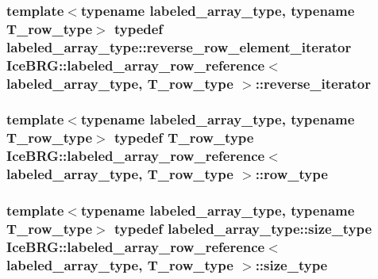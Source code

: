 \subsubsection[{reverse\+\_\+iterator}]{\setlength{\rightskip}{0pt plus 5cm}template$<$typename labeled\+\_\+array\+\_\+type, typename T\+\_\+row\+\_\+type$>$ typedef labeled\+\_\+array\+\_\+type\+::reverse\+\_\+row\+\_\+element\+\_\+iterator {\bf Ice\+B\+R\+G\+::labeled\+\_\+array\+\_\+row\+\_\+reference}$<$ labeled\+\_\+array\+\_\+type, T\+\_\+row\+\_\+type $>$\+::{\bf reverse\+\_\+iterator}}\label{classIceBRG_1_1labeled__array__row__reference_a69e88ba1f1071a47fa00e4ec45f8147d}
\hypertarget{classIceBRG_1_1labeled__array__row__reference_a5b537072b2f12f7a4ea9484e2e26986d}{}
\subsubsection[{row\+\_\+type}]{\setlength{\rightskip}{0pt plus 5cm}template$<$typename labeled\+\_\+array\+\_\+type, typename T\+\_\+row\+\_\+type$>$ typedef T\+\_\+row\+\_\+type {\bf Ice\+B\+R\+G\+::labeled\+\_\+array\+\_\+row\+\_\+reference}$<$ labeled\+\_\+array\+\_\+type, T\+\_\+row\+\_\+type $>$\+::{\bf row\+\_\+type}}\label{classIceBRG_1_1labeled__array__row__reference_a5b537072b2f12f7a4ea9484e2e26986d}
\hypertarget{classIceBRG_1_1labeled__array__row__reference_a80c5d11ebfa639fa27894ce288633df0}{}
\subsubsection[{size\+\_\+type}]{\setlength{\rightskip}{0pt plus 5cm}template$<$typename labeled\+\_\+array\+\_\+type, typename T\+\_\+row\+\_\+type$>$ typedef labeled\+\_\+array\+\_\+type\+::size\+\_\+type {\bf Ice\+B\+R\+G\+::labeled\+\_\+array\+\_\+row\+\_\+reference}$<$ labeled\+\_\+array\+\_\+type, T\+\_\+row\+\_\+type $>$\+::{\bf size\+\_\+type}}\label{classIceBRG_1_1labeled__array__row__reference_a80c5d11ebfa639fa27894ce288633df0}
\hypertarget{classIceBRG_1_1labeled__array__row__reference_ae6cfe4bdcb3bc59c3d7613193633f063}{}
